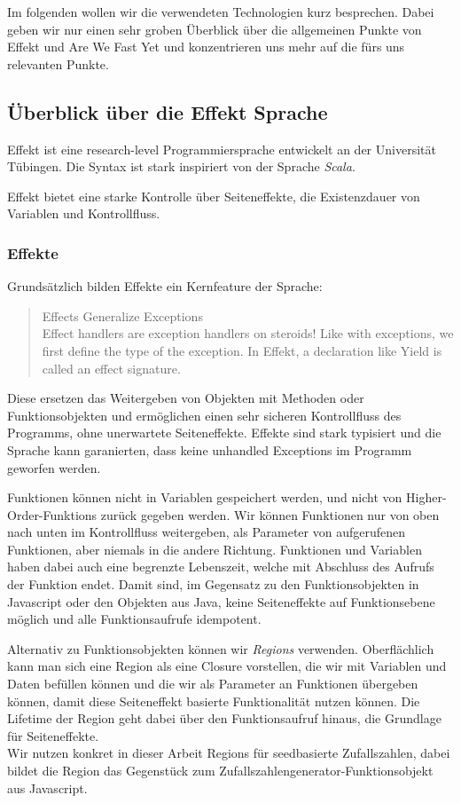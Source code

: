 Im folgenden wollen wir die verwendeten Technologien kurz besprechen.
Dabei geben wir nur einen sehr groben Überblick über die allgemeinen Punkte von Effekt und Are We Fast Yet und konzentrieren uns mehr auf die fürs uns relevanten Punkte.

\subsection{ Überblick über die Effekt Sprache  }	
Effekt ist eine research-level Programmiersprache entwickelt an der Universität Tübingen.
Die Syntax ist stark inspiriert von der Sprache \textit{Scala}.

Effekt bietet eine starke Kontrolle über Seiteneffekte, die Existenzdauer von Variablen und Kontrollfluss.

\subsubsection{ Effekte }

Grundsätzlich bilden Effekte ein Kernfeature der Sprache:
\begin{quote}
    Effects Generalize Exceptions\\
    Effect handlers are exception handlers on steroids! Like with exceptions, we first define the type of the exception. In Effekt, a declaration like Yield is called an effect signature.
\end{quote}

Diese ersetzen das Weitergeben von Objekten mit Methoden oder Funktionsobjekten und ermöglichen einen sehr sicheren Kontrollfluss des Programms, ohne unerwartete Seiteneffekte.
Effekte sind stark typisiert und die Sprache kann garanierten, dass keine unhandled Exceptions im Programm geworfen werden.

Funktionen können nicht in Variablen gespeichert werden, und nicht von Higher-Order-Funktions zurück gegeben werden. Wir können Funktionen nur von oben nach unten im Kontrollfluss weitergeben, als Parameter von aufgerufenen Funktionen, aber niemals in die andere Richtung. Funktionen und Variablen haben dabei auch eine begrenzte Lebenszeit, welche mit Abschluss des Aufrufs der Funktion endet.
Damit sind, im Gegensatz zu den Funktionsobjekten in Javascript oder den Objekten aus Java, keine Seiteneffekte auf Funktionsebene möglich und alle Funktionsaufrufe idempotent.

Alternativ zu Funktionsobjekten können wir \textit{Regions} verwenden. Oberflächlich kann man sich eine Region als eine Closure vorstellen, die wir mit Variablen und Daten befüllen können und die wir als Parameter an Funktionen übergeben können, damit diese Seiteneffekt basierte Funktionalität nutzen können. Die Lifetime der Region geht dabei über den Funktionsaufruf hinaus, die Grundlage für Seiteneffekte.\\
Wir nutzen konkret in dieser Arbeit Regions für seedbasierte Zufallszahlen, dabei bildet die Region das Gegenstück zum Zufallszahlengenerator-Funktionsobjekt aus Javascript.

